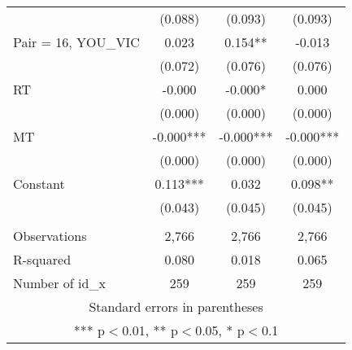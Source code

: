 \documentclass[]{article}
\begin{document}
\begin{tabular}{lccc}
 & (0.088) & (0.093) & (0.093) \\
Pair = 16, YOU\_VIC & 0.023 & 0.154** & -0.013 \\
 & (0.072) & (0.076) & (0.076) \\
RT & -0.000 & -0.000* & 0.000 \\
 & (0.000) & (0.000) & (0.000) \\
MT & -0.000*** & -0.000*** & -0.000*** \\
 & (0.000) & (0.000) & (0.000) \\
Constant & 0.113*** & 0.032 & 0.098** \\
 & (0.043) & (0.045) & (0.045) \\
 &  &  &  \\
Observations & 2,766 & 2,766 & 2,766 \\
R-squared & 0.080 & 0.018 & 0.065 \\
 Number of id\_x & 259 & 259 & 259 \\ \hline
\multicolumn{4}{c}{ Standard errors in parentheses} \\
\multicolumn{4}{c}{ *** p$<$0.01, ** p$<$0.05, * p$<$0.1} \\
\end{tabular}
\end{document}
